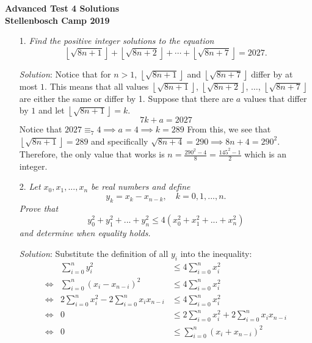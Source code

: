 \documentclass{article}
\begin{document}
\begin{center}
  \textbf{\Large Advanced Test 4 Solutions}
  \\ \vspace{1em}
  \textbf{\large Stellenbosch Camp 2019}
\end{center}

\vspace{12pt}


\begin{enumerate}

\item[1.] %
\newcommand{\floorsqrt}[1]{\left\lfloor\sqrt{#1}\right\rfloor} 
\textit{
Find the positive integer solutions to the equation
\[ \floorsqrt{8n+1} +\floorsqrt{8n+2} +\dotsb +\floorsqrt{8n+7} = 2027. \]}

\textit{Solution}:
Notice that for $n > 1$, $\floorsqrt{8n + 1}$ and $\floorsqrt{8n + 7}$ differ by at most $1$. This means that all values $\floorsqrt{8n + 1}$, $\floorsqrt{8n + 2}$, $\dots$, $\floorsqrt{8n + 7}$ are either the same or differ by 1. Suppose that there are $a$ values that differ by $1$ and let $\floorsqrt{8n + 1} = k$.
$$7k + a = 2027$$
Notice that $2027 \equiv _7 4 \implies a = 4 \implies k = 289$ From this, we see that $\floorsqrt{8n + 1} = 289$ and specifically $\sqrt{8n + 4} = 290 \implies 8n + 4 = 290^2$. Therefore, the only value that works is $n = \frac{290^2 - 4}{8} = \frac{145^2 - 1}{2}$ which is an integer.

\item[2.] %
\textit{
Let $x_0, x_1,..., x_n$ be real numbers and define
\[y_k=x_k-x_{n-k}, \quad k=0,1,...,n.\]
Prove that 
\[y_0^2 + y_1^2+...+ y_n^2 \leq 4(x_0^2 + x_1^2 + ... + x_n^2) \]
and determine when equality holds.
}

\textit{Solution}: 
Substitute the definition of all $y_i$ into the inequality:
\begin{align*}
  &&\sum_{i = 0}^{n}y_i^2 &\leq 4\sum_{i = 0}^{n}x_i^2 &\\
  &\iff& \sum_{i = 0}^{n}(x_i - x_{n-i})^2 &\leq 4\sum_{i = 0}^{n}x_i^2 &\\
  &\iff& 2\sum_{i = 0}^{n}x_i^2 - 2\sum_{i = 0}^{n}x_ix_{n-i} &\leq 4\sum_{i = 0}^{n}x_i^2& \\
  &\iff& 0 &\leq 2\sum_{i = 0}^{n}x_i^2 + 2\sum_{i = 0}^{n}x_ix_{n-i} \\
  &\iff& 0 &\leq \sum_{i = 0}^{n}(x_i + x_{n-i})^2 &
\end{align*}


\end{enumerate}
\end{document}
